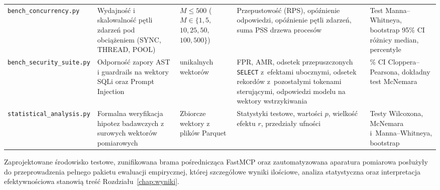 \begin{table}[!htbp]
\begin{tabular}{>{\raggedright\arraybackslash}p{2.5cm} >{\raggedright\arraybackslash}p{3.8cm} >{\raggedright\arraybackslash}p{1.7cm} >{\raggedright\arraybackslash}p{3.7cm} >{\raggedright\arraybackslash}p{2.5cm}}
\addlinespace
\texttt{bench\_}\allowbreak\texttt{concurrency}\allowbreak\texttt{.py} & Wydajność i skalowalność pętli zdarzeń pod obciążeniem (SYNC, THREAD, POOL) & $M \le 500$ ($M \in \{1, 5,$ \newline $10, 25, 50,$ \newline $100, 500\}$) & Przepustowość (RPS), opóźnienie odpowiedzi, opóźnienie pętli zdarzeń, suma PSS drzewa procesów & Test Manna--Whitneya, bootstrap 95\% CI różnicy median, percentyle \\
\addlinespace
\texttt{bench\_security\_}\allowbreak\texttt{suite.py} & Odporność zapory AST i guardrails na wektory SQLi oraz Prompt Injection & \wynSecTotal{} unikalnych wektorów & FPR, AMR, odsetek przepuszczonych \texttt{SELECT} z~efektami ubocznymi, odsetek rekordów z~pozostałymi tokenami sterującymi, odpowiedzi modelu na wektory wstrzykiwania & 95\% CI Cloppera--Pearsona, dokładny test McNemara \\
\addlinespace
\texttt{statistical\_}\allowbreak\texttt{analysis.py} & Formalna weryfikacja hipotez badawczych z surowych wektorów pomiarowych & Zbiorcze wektory z plików Parquet & Statystyki testowe, wartości $p$, wielkość efektu $r$, przedziały ufności & Testy Wilcoxona, McNemara i~Manna--Whitneya, bootstrap \\
\bottomrule
\end{tabular}
\end{table}

Zaprojektowane środowisko testowe, zunifikowana brama pośrednicząca FastMCP oraz zautomatyzowana aparatura pomiarowa posłużyły do przeprowadzenia pełnego pakietu ewaluacji empirycznej, której szczegółowe wyniki ilościowe, analiza statystyczna oraz interpretacja efektywnościowa stanowią treść Rozdziału~\ref{chap:wyniki}.
